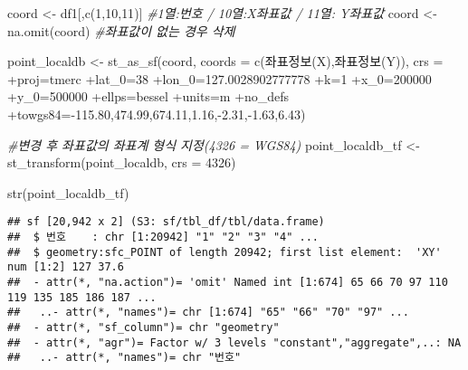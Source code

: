\documentclass[
]{book}
\newenvironment{Shaded}{\begin{snugshade}}{\end{snugshade}}
\newcommand{\AttributeTok}[1]{\textcolor[rgb]{0.77,0.63,0.00}{#1}}
\newcommand{\CommentTok}[1]{\textcolor[rgb]{0.56,0.35,0.01}{\textit{#1}}}
\newcommand{\DecValTok}[1]{\textcolor[rgb]{0.00,0.00,0.81}{#1}}
\newcommand{\FunctionTok}[1]{\textcolor[rgb]{0.00,0.00,0.00}{#1}}
\newcommand{\NormalTok}[1]{#1}
\newcommand{\OtherTok}[1]{\textcolor[rgb]{0.56,0.35,0.01}{#1}}
\newcommand{\SpecialCharTok}[1]{\textcolor[rgb]{0.00,0.00,0.00}{#1}}
\newcommand{\StringTok}[1]{\textcolor[rgb]{0.31,0.60,0.02}{#1}}
\begin{document}
\begin{Shaded}
\begin{Highlighting}[]
\NormalTok{coord }\OtherTok{\textless{}{-}}\NormalTok{ df1[,}\FunctionTok{c}\NormalTok{(}\DecValTok{1}\NormalTok{,}\DecValTok{10}\NormalTok{,}\DecValTok{11}\NormalTok{)] }\CommentTok{\#1열:번호 / 10열:X좌표값 / 11열: Y좌표값 }
\NormalTok{coord }\OtherTok{\textless{}{-}} \FunctionTok{na.omit}\NormalTok{(coord) }\CommentTok{\#좌표값이 없는 경우 삭제}

\NormalTok{point\_localdb }\OtherTok{\textless{}{-}} \FunctionTok{st\_as\_sf}\NormalTok{(coord, }\AttributeTok{coords =} \FunctionTok{c}\NormalTok{(}\StringTok{\textquotesingle{}좌표정보(X)\textquotesingle{}}\NormalTok{,}\StringTok{\textquotesingle{}좌표정보(Y)\textquotesingle{}}\NormalTok{), }\AttributeTok{crs =} \StringTok{\textquotesingle{}+proj=tmerc +lat\_0=38 +lon\_0=127.0028902777778 +k=1 +x\_0=200000 +y\_0=500000 +ellps=bessel +units=m +no\_defs +towgs84={-}115.80,474.99,674.11,1.16,{-}2.31,{-}1.63,6.43\textquotesingle{}}\NormalTok{)}

\CommentTok{\#변경 후 좌표값의 좌표계 형식 지정(4326 = WGS84)}
\NormalTok{point\_localdb\_tf }\OtherTok{\textless{}{-}} \FunctionTok{st\_transform}\NormalTok{(point\_localdb, }\AttributeTok{crs =} \DecValTok{4326}\NormalTok{)}

\FunctionTok{str}\NormalTok{(point\_localdb\_tf)}
\end{Highlighting}
\end{Shaded}

\begin{verbatim}
## sf [20,942 x 2] (S3: sf/tbl_df/tbl/data.frame)
##  $ 번호    : chr [1:20942] "1" "2" "3" "4" ...
##  $ geometry:sfc_POINT of length 20942; first list element:  'XY' num [1:2] 127 37.6
##  - attr(*, "na.action")= 'omit' Named int [1:674] 65 66 70 97 110 119 135 185 186 187 ...
##   ..- attr(*, "names")= chr [1:674] "65" "66" "70" "97" ...
##  - attr(*, "sf_column")= chr "geometry"
##  - attr(*, "agr")= Factor w/ 3 levels "constant","aggregate",..: NA
##   ..- attr(*, "names")= chr "번호"
\end{verbatim}

\begin{Shaded}
\end{Shaded}
\end{document}
